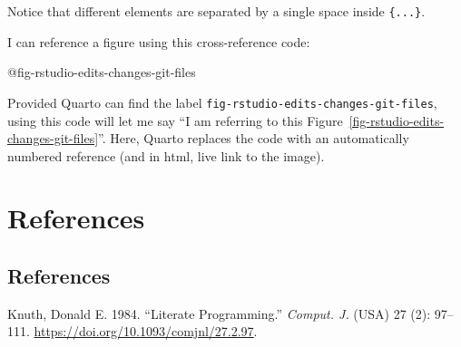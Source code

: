 \documentclass[
  letterpaper,
  DIV=11,
  numbers=noendperiod]{scrreprt}
\newenvironment{Shaded}{\begin{snugshade}}{\end{snugshade}}
\newcommand{\NormalTok}[1]{\textcolor[rgb]{0.00,0.23,0.31}{#1}}
\newcommand{\SpecialCharTok}[1]{\textcolor[rgb]{0.37,0.37,0.37}{#1}}
\newlength{\cslhangindent}
\newenvironment{CSLReferences}[2] %
 {\begin{list}{}{%
  \setlength{\itemindent}{0pt}
  \setlength{\leftmargin}{0pt}
  \setlength{\parsep}{0pt}
  \ifodd #1
   \setlength{\leftmargin}{\cslhangindent}
   \setlength{\itemindent}{-1\cslhangindent}
  \fi
  \setlength{\itemsep}{#2\baselineskip}}}
 {\end{list}}
\begin{document}
Notice that different elements are separated by a single space inside
\texttt{\{...\}}.

I can reference a figure using this cross-reference code:

\begin{Shaded}
\begin{Highlighting}[]
\SpecialCharTok{@}\NormalTok{fig}\SpecialCharTok{{-}}\NormalTok{rstudio}\SpecialCharTok{{-}}\NormalTok{edits}\SpecialCharTok{{-}}\NormalTok{changes}\SpecialCharTok{{-}}\NormalTok{git}\SpecialCharTok{{-}}\NormalTok{files}
\end{Highlighting}
\end{Shaded}

Provided Quarto can find the label
\texttt{fig-rstudio-edits-changes-git-files}, using this code will let
me say ``I am referring to this
Figure~\ref{fig-rstudio-edits-changes-git-files}''. Here, Quarto
replaces the code with an automatically numbered reference (and in html,
live link to the image).

\part{References}


\chapter*{References}\label{references-1}


\protect{}\label{refs}
\begin{CSLReferences}{1}{1}
Knuth, Donald E. 1984. {``Literate Programming.''} \emph{Comput. J.}
(USA) 27 (2): 97--111. \url{https://doi.org/10.1093/comjnl/27.2.97}.

\end{CSLReferences}
\end{document}
